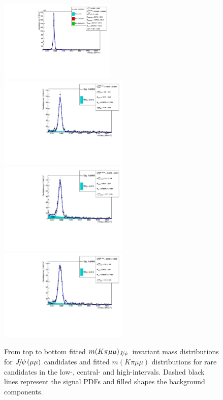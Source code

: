 \begin{figure}[h!]
\centering
\includegraphics[width=0.49\textwidth]{RKst/figs/Fit/fit_MM/KstJPsMM.pdf}
\includegraphics[width=0.55\textwidth]{RKst/figs/Fit/fit_MM/KstMM_low.pdf}
\includegraphics[width=0.55\textwidth]{RKst/figs/Fit/fit_MM/KstMM_central.pdf}
\includegraphics[width=0.55\textwidth]{RKst/figs/Fit/fit_MM/KstMM_high.pdf}
\caption{From top to bottom fitted $m(K\pi \mu\mu)_\jpsi$ invariant mass distributions
 for $\jpsi(\mu\mu)$ candidates and fitted $m(K\pi \mu\mu)$ distributions for rare candidates 
 in the low-, central- and high-\qsq intervals. Dashed black lines represent the signal PDFs and 
 filled shapes the background components. }
\label{fig:mumu_data_fits}
\end{figure}

